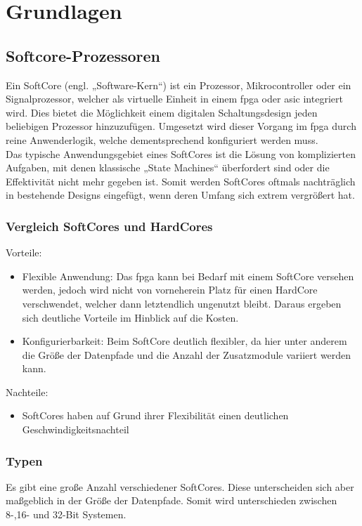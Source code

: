 \chapter{Grundlagen}\label{kap:Grundlagen}
\section{Softcore-Prozessoren}\label{kap:softcoreprozessoren}

Ein SoftCore (engl. „Software-Kern“) ist ein Prozessor, Mikrocontroller oder ein Signalprozessor, welcher als virtuelle Einheit in einem \ac{fpga} oder \ac{asic} integriert wird.
Dies bietet die Möglichkeit einem digitalen Schaltungsdesign jeden beliebigen Prozessor hinzuzufügen. Umgesetzt wird dieser Vorgang im \ac{fpga} durch reine Anwenderlogik,
welche dementsprechend konfiguriert werden muss.\\
Das typische Anwendungsgebiet eines SoftCores ist die Lösung von komplizierten Aufgaben, mit denen klassische „State Machines“ überfordert sind oder die Effektivität
 nicht mehr gegeben ist. Somit werden SoftCores oftmals nachträglich in bestehende Designs eingefügt, wenn deren Umfang sich extrem vergrößert hat.\cite{softcore}\\

\subsection{Vergleich SoftCores und HardCores}\label{kap:vergleich}
Vorteile:
\begin{itemize}
   \item Flexible Anwendung: Das \ac{fpga} kann bei Bedarf mit einem SoftCore versehen werden, jedoch wird nicht von vorneherein Platz für einen HardCore verschwendet, welcher
    dann letztendlich ungenutzt bleibt. Daraus ergeben sich deutliche Vorteile im Hinblick auf die Kosten.
    \item Konfigurierbarkeit: Beim SoftCore deutlich flexibler, da hier unter anderem die Größe der Datenpfade und die Anzahl der Zusatzmodule variiert werden kann.
 \end{itemize}


Nachteile:
\begin{itemize}
  \item SoftCores haben auf Grund ihrer Flexibilität einen deutlichen Geschwindigkeitsnachteil
\end{itemize}

\subsection{Typen}\label{kap:typen}
Es gibt eine große Anzahl verschiedener SoftCores. Diese unterscheiden sich aber maßgeblich in der Größe der Datenpfade.
Somit wird unterschieden zwischen 8-,16- und 32-Bit Systemen.\cite{softcore}\\


